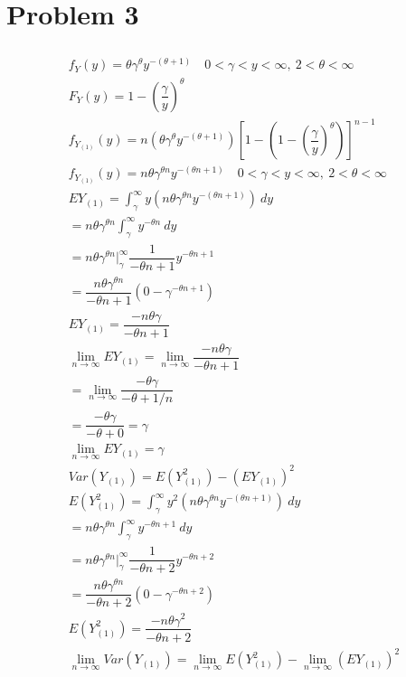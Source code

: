 \documentclass{article}
\begin{document}
\begin{flushleft}
\begin{enumerate}[(a)]
\end{enumerate}
\pagebreak
	\section*{Problem 3}
	
\begin{multline*}\\
f_Y(y)=\theta \gamma^{\theta} y^{-(\theta+1)}\quad 0<\gamma<y<\infty, \ 2<\theta<\infty\\
F_Y(y)=1-\left(\dfrac{\gamma}{y}\right)^{\theta}\\
f_{Y_{(1)}}(y)=n(\theta \gamma^{\theta} y^{-(\theta+1)})\left[1-\left(1-\left(\dfrac{\gamma}{y}\right)^{\theta}\right)\right]^{n-1}\\
f_{Y_{(1)}}(y)=n\theta\gamma^{\theta n}y^{-(\theta n+1)} \quad 0<\gamma<y<\infty, \ 2<\theta<\infty\\
EY_{(1)}=\int_{\gamma}^{\infty}y(n\theta\gamma^{\theta n}y^{-(\theta n+1)}) \ dy\\
=n\theta\gamma^{\theta n}\int_{\gamma}^{\infty}y^{-\theta n} \ dy\\
=n\theta\gamma^{\theta n}\bigg|_{\gamma}^{\infty}\dfrac{1}{-\theta n+1}y^{-\theta n+1}\\
=\dfrac{n\theta\gamma^{\theta n}}{-\theta n+1}(0-\gamma^{-\theta n +1})\\
EY_{(1)}=\dfrac{-n\theta\gamma}{-\theta n+1}\\
\lim_{n\to \infty}EY_{(1)}=\lim_{n\to \infty}\dfrac{-n\theta\gamma}{-\theta n+1}\\
=\lim_{n\to \infty}\dfrac{-\theta\gamma}{-\theta +1/n}\\
=\dfrac{-\theta\gamma}{-\theta+0}=\gamma\\
\lim_{n\to \infty}EY_{(1)}=\gamma\\
Var(Y_{(1)})=E(Y_{(1)}^2)-(EY_{(1)})^2\\
E(Y_{(1)}^2)=\int_{\gamma}^{\infty}y^2(n\theta\gamma^{\theta n}y^{-(\theta n+1)}) \ dy\\
=n\theta\gamma^{\theta n}\int_{\gamma}^{\infty}y^{-\theta n+1} \ dy\\
=n\theta\gamma^{\theta n}\bigg|_{\gamma}^{\infty}\dfrac{1}{-\theta n+2}y^{-\theta n+2}\\
=\dfrac{n\theta\gamma^{\theta n}}{-\theta n+2}(0-\gamma^{-\theta n +2})\\
E(Y_{(1)}^2)=\dfrac{-n\theta\gamma^2}{-\theta n+2}\\
\lim_{n\to \infty} Var(Y_{(1)})=\lim_{n\to \infty} E(Y_{(1)}^2)- \lim_{n\to \infty}(EY_{(1)})^2\\

\end{multline*}
\end{flushleft}
\end{document}
